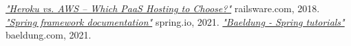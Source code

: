 \documentclass[twoside]{ctuthesis}
\begin{document}
\begin{thebibliography}{99}
        \href{https://railsware.com/blog/heroku-vs-aws-which-paas-hosting-to-choose/}{\emph{"Heroku vs. AWS – Which PaaS Hosting to Choose?"}}
        railsware.com, 2018.
        \href{https://docs.spring.io/spring-framework/docs/current/reference/html/}{\emph{"Spring framework documentation"}}
        spring.io, 2021.
        \href{https://www.baeldung.com/}{\emph{"Baeldung - Spring tutorials"}}
        baeldung.com, 2021.
    \end{thebibliography}
\end{document}
